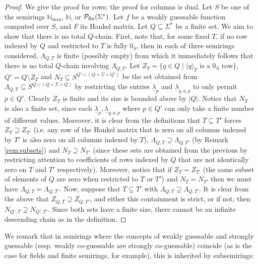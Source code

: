 \documentclass[10pt,a4paper]{amsart}
\theoremstyle{definition}
\numberwithin{equation}{section}
\numberwithin{theorem}{section}
\begin{document}
	\begin{proof}
	We give the proof for rows; the proof for columns is dual. Let $S$ be one of the semirings $\mathbb{N}_{\max}$, $\mathbb{N}$, or $\mathcal{P}_{\rm fin}(\Sigma^*)$.
	Let $f$ be a weakly guessable function computed over $S$, and $F$ its Hankel matrix. Let $Q \subseteq \Sigma^*$ be a finite set. We aim to show that there is no total $Q$-chain.
	First, note that, for some fixed $T$, if no row indexed by $Q$ and restricted to $T$ is fully $0_S$, then in each of three semirings considered, $\Lambda_{Q,T}$ is finite (possibly empty) from which it immediately follows that there is no total $Q$-chain involving $\Lambda_{Q,T}$. Let $Z_{T} = \{q \in Q \mid \langle q \rangle_T \mbox{ is a }0_S \mbox { row}\}$, $Q' = Q \setminus Z_{T}$ and $N_{T} \subseteq S^{Q' \cup (Q \times \Sigma \times Q')}$ be the set obtained from $\Lambda_{Q,T} \subseteq S^{Q \cup (Q \times \Sigma \times Q)}$ by restricting the entries $\underline{\lambda}_p$ and $\underline{\lambda}_{q,a,p}$ to only permit $p \in Q'$. Clearly $Z_{T}$ is finite and its size is bounded above by $|Q|$. Notice that $N_{T}$ is also a finite set, since each  $\underline{\lambda}_p, \underline{\lambda}_{q,a,p}$ where $p \in Q'$ can only take a finite number of different values. 
	Moreover, it is clear from the definitions that $T \subseteq T'$ forces $Z_{T}\supseteq Z_{T'}$ (i.e. any row of the Hankel matrix that is zero on all columns indexed by $T'$ is also zero on all columns indexed by $T$), $\Lambda_{Q, T} \supseteq \Lambda_{Q, T'}$ (by Remark \ref{rem:subsets}) and $N_{T} \supseteq N_{T'}$ (since these sets are obtained from the previous by restricting attention to coefficients of rows indexed by $Q$ that are not identically zero on $T$ and $T'$ respectively).  Moreover, notice that if $Z_{T}=Z_{T'}$ (the same subset of elements of $Q$ are zero when restricted to $T$ or $T'$) and $N_T=N_{T'}$ then we must have $\Lambda_{Q, T}=\Lambda_{Q, T'}$. Now, suppose that $T \subsetneq T'$ with  $\Lambda_{Q, T} \supsetneq \Lambda_{Q, T'}$. It is clear from the above that $Z_{Q, T}\supseteq Z_{Q, T'}$, and either this containment is strict, or if not, then $N_{Q', T} \supsetneq N_{Q', T'}$. Since both sets have a finite size, there cannot be an infinite descending chain as in the definition.
\end{proof}


 We remark that in semirings where the concepts of weakly guessable and strongly guessable (resp. weakly co-guessable are strongly co-guessable) coincide (as is the case for fields and finite semirings, for example), this is inherited by subsemirings:
	
\end{document}
